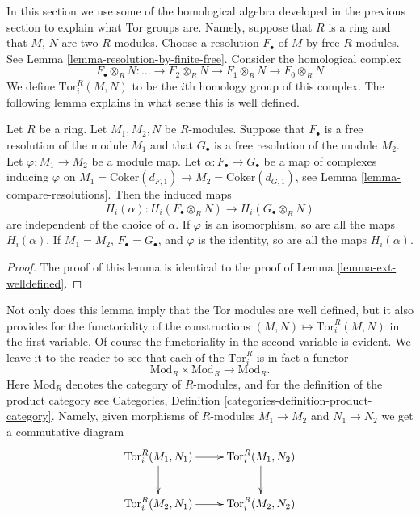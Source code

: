 \noindent
In this section we use some of the homological algebra
developed in the previous section to explain what
Tor groups are. Namely, suppose that $R$ is a ring
and that $M$, $N$ are two $R$-modules. Choose
a resolution $F_\bullet$ of $M$ by free $R$-modules.
See Lemma \ref{lemma-resolution-by-finite-free}.
Consider the homological complex
$$
F_\bullet \otimes_R N
:
\ldots
\to F_2 \otimes_R N
\to F_1 \otimes_R N
\to F_0 \otimes_R N
$$
We define $\text{Tor}^R_i(M, N)$ to be the $i$th homology
group of this complex. The following lemma explains in
what sense this is well defined.

\begin{lemma}
\label{lemma-tor-welldefined}
Let $R$ be a ring. Let $M_1, M_2, N$ be $R$-modules.
Suppose that $F_\bullet$ is a free resolution of
the module $M_1$ and that $G_\bullet$ is a free
resolution of the module $M_2$. Let $\varphi : M_1 \to M_2$
be a module map. Let $\alpha : F_\bullet \to G_\bullet$
be a map of complexes inducing $\varphi$ on
$M_1 = \text{Coker}(d_{F, 1}) \to M_2 = \text{Coker}(d_{G, 1})$,
see Lemma \ref{lemma-compare-resolutions}.
Then the induced maps
$$
H_i(\alpha) :
H_i(F_\bullet \otimes_R N)
\longrightarrow
H_i(G_\bullet \otimes_R N)
$$
are independent of the choice of $\alpha$. If $\varphi$
is an isomorphism, so are all the maps $H_i(\alpha)$.
If $M_1 = M_2$, $F_\bullet = G_\bullet$, and
$\varphi$ is the identity, so are all the maps $H_i(\alpha)$.
\end{lemma}

\begin{proof}
The proof of this lemma is identical to the proof of Lemma
\ref{lemma-ext-welldefined}.
\end{proof}

\noindent
Not only does this lemma imply that the Tor modules are well defined,
but it also provides for the functoriality of the constructions
$(M, N) \mapsto \text{Tor}_i^R(M, N)$ in the first variable. Of course
the functoriality in the second variable is evident. We leave it to
the reader to see that each of the $\text{Tor}_i^R$ is in fact
a functor
$$
\text{Mod}_R \times \text{Mod}_R \to \text{Mod}_R.
$$
Here $\text{Mod}_R$ denotes the category of $R$-modules, and
for the definition of the product category
see Categories, Definition \ref{categories-definition-product-category}.
Namely, given morphisms of $R$-modules $M_1 \to M_2$
and $N_1 \to N_2$ we get a commutative diagram
$$
\xymatrix{
\text{Tor}_i^R(M_1, N_1) \ar[r] \ar[d] &
\text{Tor}_i^R(M_1, N_2) \ar[d] \cr
\text{Tor}_i^R(M_2, N_1) \ar[r] &
\text{Tor}_i^R(M_2, N_2) \cr
}
$$

